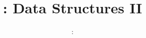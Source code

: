 \usepackage{../../beamerthemeFalmouthGamesAcademy}
\usepackage{multimedia}
\graphicspath{ {../../} }

\lstset{language=[Sharp]C
}

\usepackage[normalem]{ulem}
\usepackage{wasysym}

\usepackage{algpseudocode}

\usepackage{pdfpages}

\usetikzlibrary{arrows,automata}
\usetikzlibrary{tikzmark,calc}




\title{\sessionnumber: Data Structures II}
\subtitle{\modulecode: \moduletitle}

\frame{\titlepage} 

%








